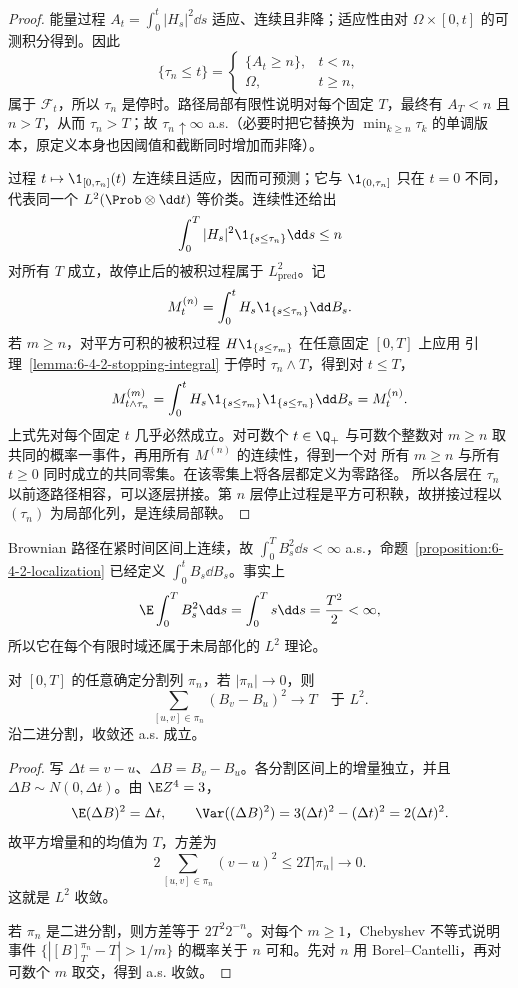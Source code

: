 \begin{proof}
能量过程 $A_t=\int_0^t|H_s|^2\dd s$ 适应、连续且非降；适应性由对
$\Omega\times[0,t]$ 的可测积分得到。因此
\[
 \{\tau_n\le t\}=
 \begin{cases}
   \{A_t\ge n\},&t<n,\\
   \Omega,&t\ge n,
 \end{cases}
\]
属于 $\mathcal F_t$，所以 $\tau_n$ 是停时。路径局部有限性说明对每个固定 $T$，最终有
$A_T<n$ 且 $n>T$，从而 $\tau_n>T$；故 $\tau_n\uparrow\infty$ a.s.（必要时把它替换为
$\min_{k\ge n}\tau_k$ 的单调版本，原定义本身也因阈值和截断同时增加而非降）。

过程 $t\mapsto\1_{[0,\tau_n]}(t)$ 左连续且适应，因而可预测；它与
$\1_{(0,\tau_n]}$ 只在 $t=0$ 不同，代表同一个
$L^2(\Prob\otimes\dd t)$ 等价类。连续性还给出
\[
 \int_0^T|H_s|^2\1_{\{s\le\tau_n\}}\dd s\le n
\]
对所有 $T$ 成立，故停止后的被积过程属于 $L^2_{\mathrm{pred}}$。记
\[
 M^{(n)}_t=\int_0^tH_s\1_{\{s\le\tau_n\}}\dd B_s.
\]
若 $m\ge n$，对平方可积的被积过程
$H\1_{\{s\le\tau_m\}}$ 在任意固定 $[0,T]$ 上应用
引理~\ref{lemma:6-4-2-stopping-integral} 于停时 $\tau_n\wedge T$，得到对 $t\le T$，
\[
 M^{(m)}_{t\wedge\tau_n}
 =\int_0^tH_s\1_{\{s\le\tau_m\}}\1_{\{s\le\tau_n\}}\dd B_s
 =M^{(n)}_t.
\]
上式先对每个固定 $t$ 几乎必然成立。对可数个
$t\in\Q_+$ 与可数个整数对 $m\ge n$ 取共同的概率一事件，再用所有 $M^{(n)}$ 的连续性，得到一个对
所有 $m\ge n$ 与所有 $t\ge0$ 同时成立的共同零集。在该零集上将各层都定义为零路径。
所以各层在 $\tau_n$ 以前逐路径相容，可以逐层拼接。第 $n$ 层停止过程是平方可积鞅，故拼接过程以
$(\tau_n)$ 为局部化列，是连续局部鞅。
\end{proof}

\begin{example}[局部化回收 $H_t=B_t$]
Brownian 路径在紧时间区间上连续，故
$\int_0^TB_s^2\dd s<\infty$ a.s.，命题~\ref{proposition:6-4-2-localization} 已经定义
$\int_0^tB_s\dd B_s$。事实上
\[
 \E\int_0^TB_s^2\dd s=\int_0^Ts\dd s=\frac{T^2}{2}<\infty,
\]
所以它在每个有限时域还属于未局部化的 $L^2$ 理论。
\end{example}

\begin{theorem}\label{theorem:6-4-2-3}
对 $[0,T]$ 的任意确定分割列 $\pi_n$，若 $|\pi_n|\to0$，则
\[
 \sum_{[u,v]\in\pi_n}(B_v-B_u)^2\longrightarrow T
 \quad\text{于 }L^2.
\]
沿二进分割，收敛还 a.s. 成立。
\end{theorem}

\begin{proof}
写 $\Delta t=v-u$、$\Delta B=B_v-B_u$。各分割区间上的增量独立，并且
$\Delta B\sim N(0,\Delta t)$。由 $\E Z^4=3$，
\[
 \E(\Delta B)^2=\Delta t,
 \qquad
 \Var((\Delta B)^2)=3(\Delta t)^2-(\Delta t)^2=2(\Delta t)^2.
\]
故平方增量和的均值为 $T$，方差为
\[
 2\sum_{[u,v]\in\pi_n}(v-u)^2
 \le2T|\pi_n|\longrightarrow0.
\]
这就是 $L^2$ 收敛。

若 $\pi_n$ 是二进分割，则方差等于 $2T^2 2^{-n}$。对每个
$m\ge1$，Chebyshev 不等式说明事件
$\{|[B]^{\pi_n}_T-T|>1/m\}$ 的概率关于 $n$ 可和。先对 $n$ 用 Borel--Cantelli，再对可数个
$m$ 取交，得到 a.s. 收敛。
\end{proof}


